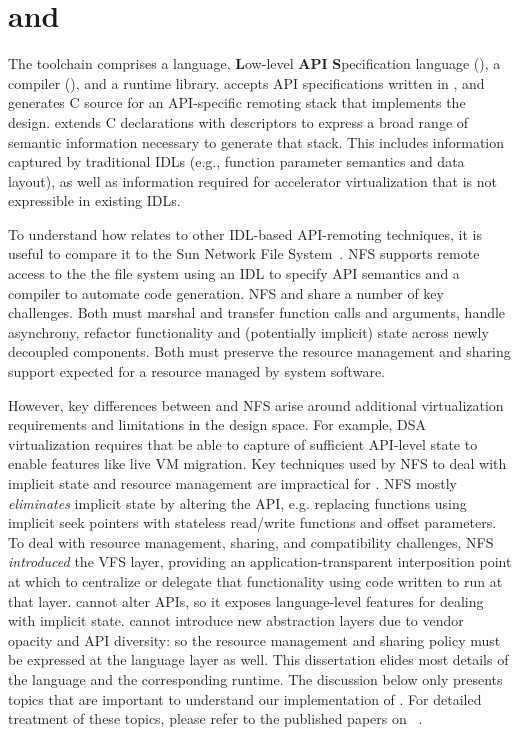 \section{\CAvA and \Lapis}
\label{s:api}
\label{s:compiler}

The \AvA toolchain comprises a language, \textbf{L}ow-level \textbf{API}
\textbf{S}pecification language (\Lapis), a compiler (\CAvA), and a runtime
library. \CAvA accepts API specifications written in \Lapis, and generates C
source for an API-specific remoting stack that implements the \hira design.
\Lapis extends C declarations with descriptors to express a broad range of
semantic information necessary to generate that stack. This includes
information captured by traditional IDLs (e.g., function parameter semantics
and data layout), as well as information required for accelerator
virtualization that is not expressible in existing IDLs.

To understand how \AvA relates to other IDL-based API-remoting techniques,
it is useful to compare it to the Sun Network File System~\cite{Sandberg:1988}.
NFS supports remote access to the the file system using an IDL to specify API
semantics and a compiler to automate code generation. NFS and \AvA share a
number of key challenges. Both must marshal and transfer function calls and
arguments, handle asynchrony, refactor functionality and (potentially
implicit) state across newly decoupled components. Both must preserve the
resource management and sharing support expected for a resource managed by
system software.

However, key differences between \AvA and NFS arise around additional
virtualization requirements and limitations in the design space. For example,
DSA virtualization requires that \AvA be able to capture of sufficient
API-level state to enable features like live VM migration. Key techniques used
by NFS to deal with implicit state and resource management are impractical for
\AvA. NFS mostly \emph{eliminates} implicit state by altering the API, e.g.
replacing functions using implicit seek pointers with stateless read/write
functions and offset parameters. To deal with resource management, sharing,
and compatibility challenges, NFS \emph{introduced} the VFS layer, providing
an application-transparent interposition point at which to centralize or
delegate that functionality using code written to run at that layer. \AvA
cannot alter APIs, so it exposes language-level features for dealing with
implicit state. \AvA cannot introduce new abstraction layers due to vendor
opacity and API diversity: so the resource management and sharing policy must
be expressed at the language layer as well. This dissertation elides most
details of the \lapis language and the corresponding runtime. The discussion
below only presents topics that are important to understand our implementation
of \hira. For detailed treatment of these topics, please refer to the
published papers on \AvA~\cite{ava-hotos,ava-asplos}.

